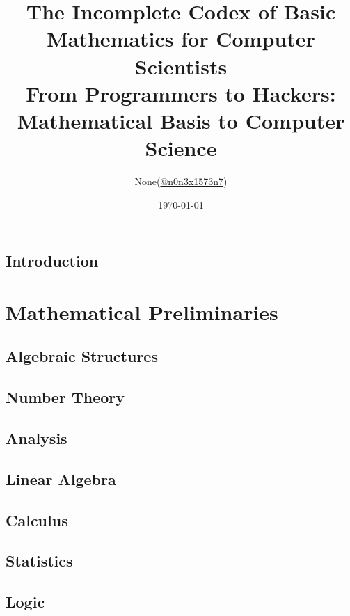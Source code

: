 \documentclass{report}
\title{
	The Incomplete Codex of Basic Mathematics for Computer Scientists\\
	\large From Programmers to Hackers: Mathematical Basis to Computer Science
}
\author{None(\href{https://www.twitter.com/n0n3x1573n7}{@n0n3x1573n7})}
\date{\today}
\theoremstyle{break}
\begin{document}
	\maketitle

	\chapter{Introduction}
		
	
	\tableofcontents
	
	\part{Mathematical Preliminaries}
	
		\chapter{Algebraic Structures}
			
	
		\chapter{Number Theory}
			
	
		\chapter{Analysis}
			
		
		\chapter{Linear Algebra}
			
		
		\chapter{Calculus}
			
		
		\chapter{Statistics}
			
	
		\chapter{Logic}
			
\end{document}
